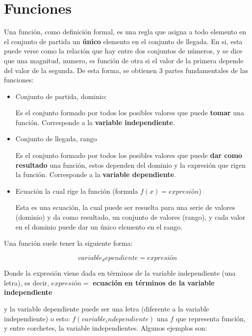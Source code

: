 \section{Funciones}

    Una función, como definición formal, es una regla que asigna a todo
    elemento en el conjunto de partida
    un \textbf{único} elemento en el conjunto de llegada. En si, esta puede verse
    como la relación que hay entre dos conjuntos de números, y se dice que
    una magnitud, numero, es función de otra si el valor de la primera depende
    del valor de la segunda. De esta forma, se obtienen 3 partes fundamentales
    de las funciones:

    \begin{itemize}
        \item Conjunto de partida, dominio:

            Es el conjunto formado por todos los posibles valores que puede \textbf{tomar}
            una función. Corresponde a la \textbf{variable independiente}.

        \item Conjunto de llegada, rango

            Es el conjunto formado por todos los posibles valores que puede \textbf{dar
            como resultado} una función, estos dependen del dominio y la expresión
            que rigen la función. Corresponde a la \textbf{variable dependiente}.

        \item Ecuación la cual rige la función (formula $f(x)= expresión$)

            Esta es una ecuación, la cual puede ser resuelta para una serie de valores
            (dominio) y da como resultado, un conjunto de valores (rango), y cada
            valor en el dominio puede dar un único elemento en el rango.
    \end{itemize}

    Una función suele tener la siguiente forma:

    $$ variable_dependiente = expresión $$

    Donde la expresión viene dada en términos de la variable independiente (una letra), es
    decir, $ expresión= $  \textbf{ecuación en términos de la variable independiente}

    y la variable dependiente puede ser una letra (diferente a la variable independiente)
    o esto: $ f(variable_independiente) $ una $ f $ que representa función, y entre
    corchetes, la variable independientes. Algunos ejemplos son:


